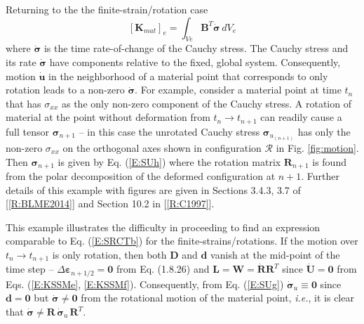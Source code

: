 \documentclass[11pt]{report}
\numberwithin{equation}{section}
\newcommand{\bmf } {\boldsymbol }  %
\newcommand{\ie}{\emph{i.e.},\xspace}
\newcommand{\nid}{\noindent}
\newcommand{\vareps}{\varepsilon}
\newcommand{\region}{\bm{\mathcal{R}}}
\begin{document}
Returning to the the finite-strain/rotation case  
%
\begin{equation}\label{E:SRCTd}
 \left [ \mathbf{K}_{mat} \right ]_e= \int_{Ve} \mathbf{B}^T \dot{\bmf{\sigma}} \, dV_e
\end{equation}
%
\nid where $\dot{\bmf{\sigma}}$ is the time rate-of-change of the Cauchy stress.
The Cauchy stress and its rate $\dot{\bmf{\sigma}}$ have components relative to the fixed,
global system. Consequently,  motion  $\dot{\bmf{u}}$ in the neighborhood of
a material point that corresponds to only 
rotation leads to a non-zero  $\dot{\bmf{\sigma}}$. For example,
consider a material point at time $t_n$ that
has $\sigma_{xx}$ as the only non-zero component of
the Cauchy stress. A rotation of material at the point without deformation
from $t_n\rightarrow t_{n+1}$  can readily cause
a full tensor $\bmf{\sigma}_{n+1}$  -- in this case the unrotated Cauchy stress 
$\bmf{\sigma}_{u_{(n+1)}}$ has only the non-zero $\sigma_{xx}$ on the orthogonal axes shown in
configuration $\region$ in Fig. \ref{fig:motion}. Then  $\bmf{\sigma}_{n+1}$ is given by 
Eq. (\ref{E:SUh}) where the
rotation matrix $\mathbf{R}_{n+1}$ is found from the polar decomposition of the deformed
configuration at $n+1$. Further details of this example with figures are given 
in Sections 3.4.3, 3.7 of  [\ref{R:BLME2014}] and Section 10.2 in [\ref{R:C1997}].

This example illustrates the difficulty in proceeding to find 
an expression comparable to Eq. (\ref{E:SRCTb}) for the finite-strains/rotations. If the motion over
$t_n\rightarrow t_{n+1}$ is only rotation, then both $\mathbf{D}$ and 
$\mathbf{d}$ vanish at the mid-point of the time step -- 
$\Delta \bmf{\vareps}_{n+1/2}=\bmf{0}$ from Eq. (1.8.26) and
$\mathbf{L}= \mathbf{W}=\dot{\mathbf{R}}\mathbf{R}^T$ since $\dot{\mathbf{U}}=\mathbf{0}$
from Eqs. (\ref{E:KSSMe}, \ref{E:KSSMf}). 
Consequently,  from Eq. (\ref{E:SUg})  $\dot{\bmf{\sigma}}_u\equiv\bmf{0}$
since $\mathbf{d}=\mathbf{0}$ but  $\dot{\bmf{\sigma}}\ne\bmf{0}$ from the rotational motion
of the material point, \ie it is clear that 
$\dot{\bmf{\sigma}}\ne\mathbf{R}\,\dot{\bmf{\sigma}}_u\,\mathbf{R}^T$.
\end{document}
